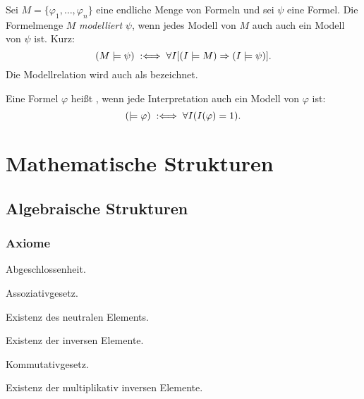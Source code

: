 \begin{definition}[Modellrelation]
Sei $M=\{\varphi_1,\ldots,\varphi_n\}$ eine endliche Menge
von Formeln und sei $\psi$ eine Formel. Die Formelmenge $M$
\emph{modelliert} $\psi$, wenn jedes Modell
von $M$ auch auch ein Modell von $\psi$ ist. Kurz:
\begin{equation}
(M\models\psi) \;:\Longleftrightarrow\; \forall I[(I\models M)\Rightarrow (I\models\psi)].
\end{equation}
Die Modellrelation wird auch als  bezeichnet.
\end{definition}


\begin{definition}[Tautologie]
Eine Formel $\varphi$ heißt ,
wenn jede Interpretation auch ein Modell von $\varphi$ ist:
\begin{equation}
(\models\varphi) \;:\Longleftrightarrow\; \forall I(I(\varphi)=1).
\end{equation}
\end{definition}

\section{Mathematische Strukturen}\label{sec:Strukturen}
\subsection{Algebraische Strukturen}
\subsubsection*{Axiome}

\noindent{} Abgeschlossenheit.

\noindent{} Assoziativgesetz.

\noindent{} Existenz des neutralen Elements.

\noindent{} Existenz der inversen Elemente.

\noindent{} Kommutativgesetz.

\noindent
{} Existenz der multiplikativ inversen Elemente.

